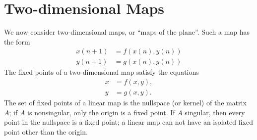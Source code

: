 \section{Two-dimensional Maps}
We now consider two-dimensional maps, or ``maps of the plane''.
Such a map has the form
\begin{equation}
\begin{split}
    x(n+1) & = f(x(n),y(n)) \\
    y(n+1) & = g(x(n),y(n))
\end{split}
\label{eqn:map}
\end{equation}
%
The fixed points of a two-dimensional map satisfy the equations
\begin{equation}
\begin{split}
   x & = f(x,y), \\
   y & = g(x,y).
\end{split}
\label{eqn:twodimfixedpoints}
\end{equation}
The set of fixed points of a linear map is
the nullspace (or kernel) of the matrix $A$; if
$A$ is nonsingular, only the origin is a fixed point.
If $A$ singular, then every point in the nullspace
is a fixed point;  a linear map can not have an
isolated fixed point other than the origin.


